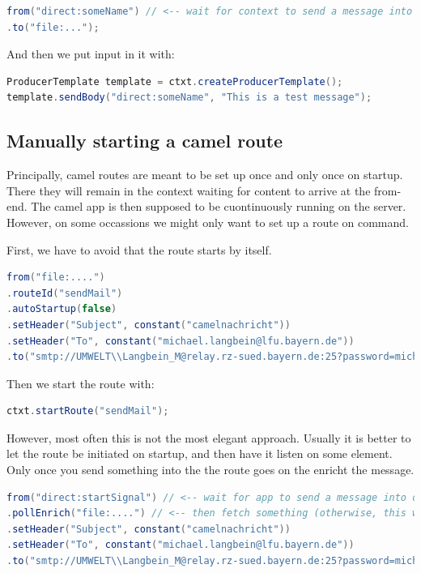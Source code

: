 \begin{lstlisting}[language=java]
from("direct:someName") // <-- wait for context to send a message into direct
.to("file:...");
\end{lstlisting}

And then we put input in it with:

\begin{lstlisting}[language=java]
ProducerTemplate template = ctxt.createProducerTemplate();
template.sendBody("direct:someName", "This is a test message");
\end{lstlisting}

\subsection{Manually starting a camel route}

Principally, camel routes are meant to be set up once and only once on startup. There they will remain in the context waiting for content to arrive at the from-end. The camel app is then supposed to be cuontinuously running on the server. However, on some occassions we might only want to set up a route on command.

First, we have to avoid that the route starts by itself. 

\begin{lstlisting}[language=java]
from("file:....")
.routeId("sendMail")
.autoStartup(false)
.setHeader("Subject", constant("camelnachricht"))
.setHeader("To", constant("michael.langbein@lfu.bayern.de"))
.to("smtp://UMWELT\\Langbein_M@relay.rz-sued.bayern.de:25?password=michael86&from=alarmplaene@lfu.bayern.de");
\end{lstlisting}

Then we start the route with:

\begin{lstlisting}[language=java]
ctxt.startRoute("sendMail");
\end{lstlisting}

However, most often this is not the most elegant approach. Usually it is better to let the route be initiated on startup, and then have it listen on some  element. Only once you send something into the  the route goes on the enricht the message.

\begin{lstlisting}[language=java]
from("direct:startSignal") // <-- wait for app to send a message into direct
.pollEnrich("file:....") // <-- then fetch something (otherwise, this would have stood under from() )
.setHeader("Subject", constant("camelnachricht"))
.setHeader("To", constant("michael.langbein@lfu.bayern.de"))
.to("smtp://UMWELT\\Langbein_M@relay.rz-sued.bayern.de:25?password=michael86&from=alarmplaene@lfu.bayern.de");
\end{lstlisting}


